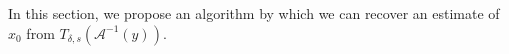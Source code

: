 In this section, we propose an algorithm by which we can recover an estimate of $x_0$ from $T_{\delta, s}(\mathcal{A}^{-1}(y))$.
